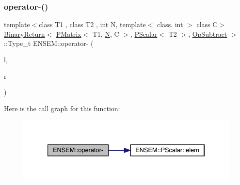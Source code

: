 \mbox{\label{group__primmatrix_gaa44a21f7776bb8fe8502a30e74d88e3f}} 
\subsubsection{\texorpdfstring{operator-\/()}{operator-()}\hspace{0.1cm}{\footnotesize\ttfamily [3/4]}}
{\footnotesize\ttfamily template$<$class T1 , class T2 , int N, template$<$ class, int $>$ class C$>$ \\
\mbox{\hyperlink{structENSEM_1_1BinaryReturn}{Binary\+Return}}$<$ \mbox{\hyperlink{classENSEM_1_1PMatrix}{P\+Matrix}}$<$ T1, \mbox{\hyperlink{adat__devel_2lib_2hadron_2operator__name__util_8cc_a7722c8ecbb62d99aee7ce68b1752f337}{N}}, C $>$, \mbox{\hyperlink{classENSEM_1_1PScalar}{P\+Scalar}}$<$ T2 $>$, \mbox{\hyperlink{structENSEM_1_1OpSubtract}{Op\+Subtract}} $>$\+::Type\+\_\+t E\+N\+S\+E\+M\+::operator-\/ (\begin{DoxyParamCaption}\item[{const \mbox{\hyperlink{classENSEM_1_1PMatrix}{P\+Matrix}}$<$ T1, \mbox{\hyperlink{adat__devel_2lib_2hadron_2operator__name__util_8cc_a7722c8ecbb62d99aee7ce68b1752f337}{N}}, C $>$ \&}]{l,  }\item[{const \mbox{\hyperlink{classENSEM_1_1PScalar}{P\+Scalar}}$<$ T2 $>$ \&}]{r }\end{DoxyParamCaption})\hspace{0.3cm}{\ttfamily [inline]}}

Here is the call graph for this function\+:\nopagebreak
\begin{figure}[H]
\begin{center}
\leavevmode
\includegraphics[width=333pt]{df/d0a/group__primmatrix_gaa44a21f7776bb8fe8502a30e74d88e3f_cgraph}
\end{center}
\end{figure}
\mbox{\label{group__primmatrix_ga6f60741d61098ca196a5f733f86a5835}} 
